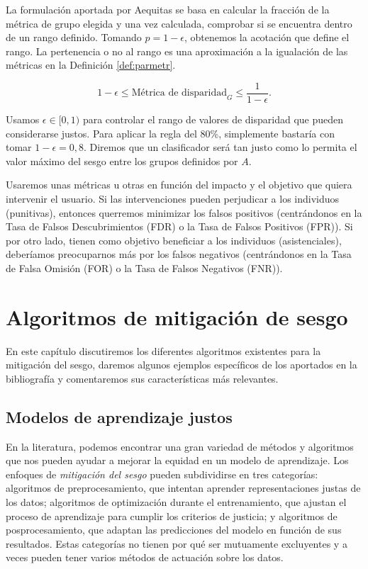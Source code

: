 \documentclass[oneside,openright,titlepage,numbers=noenddot,openany,headinclude,footinclude=true,
cleardoublepage=empty,abstractoff,BCOR=5mm,paper=a4,fontsize=12pt,main=spanish]{scrreprt}
\begin{document}
La formulación aportada por Aequitas se basa en calcular la fracción de la métrica de grupo elegida y una vez calculada, comprobar si se encuentra dentro de un rango definido. Tomando $p=1-\epsilon$, obtenemos la acotación que define el rango. La pertenencia o no al rango es una aproximación a la igualación de las métricas en la Definición \ref{def:parmetr}.

\begin{equation}
1-\epsilon \leq \text{Métrica de disparidad}_{G} \leq \frac{1}{1-\epsilon}.
\end{equation}

Usamos $\epsilon \in
[0,1)$ para controlar el rango de valores de disparidad que pueden considerarse justos. Para aplicar la regla del 80\%, simplemente bastaría con tomar $1-\epsilon=0,8$. Diremos que un clasificador será tan justo como lo permita el valor máximo del sesgo entre los grupos definidos por $A$. 

Usaremos unas métricas u otras en función del impacto y el objetivo que quiera intervenir el usuario. Si las intervenciones pueden perjudicar a los individuos (punitivas), entonces querremos minimizar los falsos positivos (centrándonos en la Tasa de Falsos Descubrimientos (FDR) o la Tasa de Falsos Positivos (FPR)). Si por otro lado, tienen como objetivo beneficiar a los individuos (asistenciales), deberíamos preocuparnos más por los falsos negativos (centrándonos en la Tasa de Falsa Omisión (FOR) o la Tasa de Falsos Negativos (FNR)).

\chapter{Algoritmos de mitigación de sesgo} \label{ch:algmitigar}

En este capítulo discutiremos los diferentes algoritmos existentes para la mitigación del sesgo, daremos algunos ejemplos específicos de los aportados en la bibliografía y comentaremos sus características más relevantes.

\section{Modelos de aprendizaje justos}

En la literatura, podemos encontrar una gran variedad de métodos y algoritmos que nos pueden ayudar a mejorar la equidad en un modelo de aprendizaje. Los enfoques de \textit{mitigación del sesgo} pueden subdividirse en tres categorías: algoritmos de preprocesamiento, que intentan aprender representaciones justas de los datos; algoritmos de optimización durante el entrenamiento, que ajustan el proceso de aprendizaje para cumplir los criterios de justicia; y algoritmos de posprocesamiento, que adaptan las predicciones del modelo en función de sus resultados. Estas categorías no tienen por qué ser mutuamente excluyentes y a veces pueden tener varios métodos de actuación sobre los datos.
\end{document}
